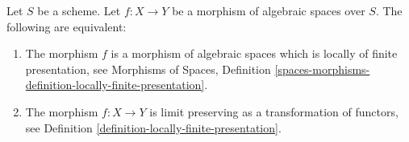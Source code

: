 \begin{proposition}
\label{proposition-characterize-locally-finite-presentation}
Let $S$ be a scheme. Let $f : X \to Y$ be a morphism of algebraic
spaces over $S$. The following are equivalent:
\begin{enumerate}
\item The morphism $f$ is a morphism of algebraic spaces which is
locally of finite presentation, see
Morphisms of Spaces,
Definition \ref{spaces-morphisms-definition-locally-finite-presentation}.
\item The morphism $f : X \to Y$ is limit preserving as
a transformation of functors, see
Definition \ref{definition-locally-finite-presentation}.
\end{enumerate}
\end{proposition}

